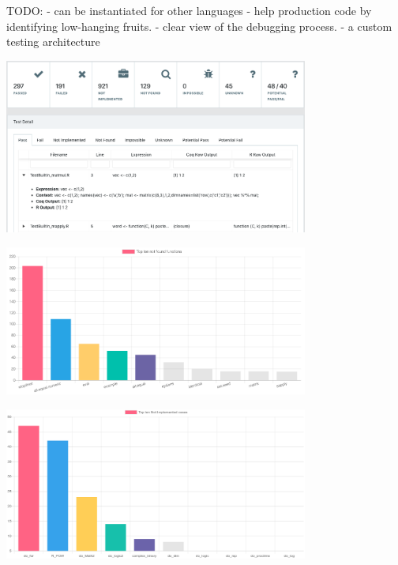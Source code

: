 \documentclass{beamer}
\begin{document}
\begin{frame}

    TODO:
    - can be instantiated for other languages
    - help production code by identifying low-hanging fruits.
    - clear view of the debugging process.
    - a custom testing architecture

\end{frame}

\begin{frame}

    \begin{center}
        \includegraphics[width=10cm]{../framework.png}
    \end{center}

\end{frame}

\begin{frame}

    \begin{center}
        \includegraphics[width=10cm]{../missing_functions_base_r.png}
    \end{center}

\end{frame}

\begin{frame}

    \begin{center}
        \includegraphics[width=10cm]{../not-implemented.png}
    \end{center}

\end{frame}
\end{document}
